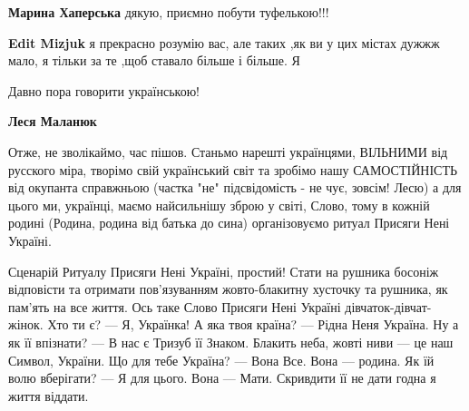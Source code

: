 \begin{itemize}
\begin{itemize}
\begin{itemize}
 
\textbf{Марина Хаперська} дякую, приємно побути туфелькою!!!
\end{itemize}

 
\textbf{Edit Mizjuk} я прекрасно розумію вас, але таких ,як ви у цих містах
дужжж мало, я тільки за те ,щоб ставало більше і більше.  Я

\end{itemize}

 
Давно пора говорити українською!


 
\textbf{Леся Маланюк} 

Отже, не зволікаймо, час пішов. Станьмо нарешті українцями, ВІЛЬНИМИ від
русского міра, творімо свій український світ та зробімо нашу САМОСТІЙНІСТЬ від
окупанта справжньою (частка "не" підсвідомість - не чує, зовсім! Лесю) а для
цього ми, українці, маємо найсильнішу зброю у світі, Слово, тому в кожній
родині (Родина, родина від батька до сина) організовуємо ритуал Присяги Нені
Україні.

Сценарій Ритуалу Присяги Нені Україні, простий! Стати на рушника босоніж
відповісти та отримати пов’язуванням жовто-блакитну хусточку та рушника, як
пам'ять на все життя. Ось таке Слово Присяги Нені Україні
дівчаток-дівчат-жінок. Хто ти є? — Я, Українка! А яка твоя країна? — Рідна Неня
Україна. Ну а як її впізнати? — В нас є Тризуб її Знаком. Блакить неба, жовті
ниви — це наш Символ, України. Що для тебе Україна? — Вона Все. Вона — родина.
Як їй волю вберігати? — Я для цього. Вона — Мати. Скривдити її не дати годна я
життя віддати.


\end{itemize}
